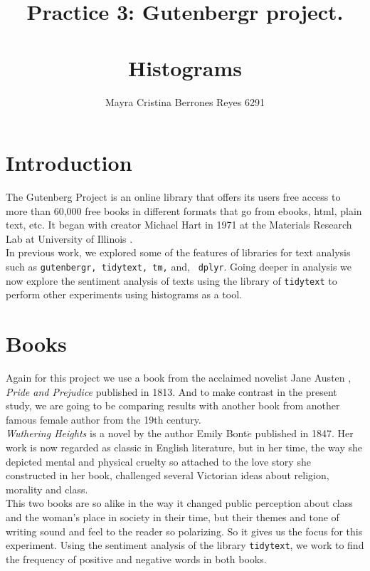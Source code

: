 \documentclass{article}
\begin{document}
\title{%
  Practice 3: Gutenbergr project. \\~\\
  \Large Histograms}
\author{Mayra Cristina Berrones Reyes 6291}

\maketitle

\section{Introduction}

The Gutenberg Project is an online library that offers its users free access to more than 60,000 free books in different formats that go from ebooks, html, plain text, etc. It began with creator Michael Hart in 1971 at the Materials Research Lab at University of Illinois \cite{guten}.\\

In previous work, we explored some of the features of libraries for text analysis such as \texttt{gutenbergr, tidytext, tm,} and, \texttt{ dplyr}. Going deeper in analysis we now explore the sentiment analysis of texts using the library of \texttt{tidytext} to perform other experiments using histograms as a tool.\\

\section{Books}

Again for this project we use a book from the acclaimed novelist Jane Austen \cite{austen}, \textit{Pride and Prejudice} \cite{pride} published in 1813. And to make contrast in the present study, we are going to be comparing results with another book from another famous female author from the 19th century. \\

\textit{Wuthering Heights} \cite{wuhe} is a novel by the author Emily Bont$\ddot{e}$ \cite{emily} published in 1847. Her work is now regarded as classic in English literature, but in her time, the way she depicted mental and physical cruelty so attached to the love story she constructed in her book, challenged several Victorian ideas about religion, morality and class. \\

This two books are so alike in the way it changed public perception about class and the woman's place in society in their time, but their themes and tone of writing sound and feel to the reader so polarizing. So it gives us the focus for this experiment. Using the sentiment analysis of the library \texttt{tidytext}, we work to find the frequency of positive and negative words in both books.\\
\end{document}

